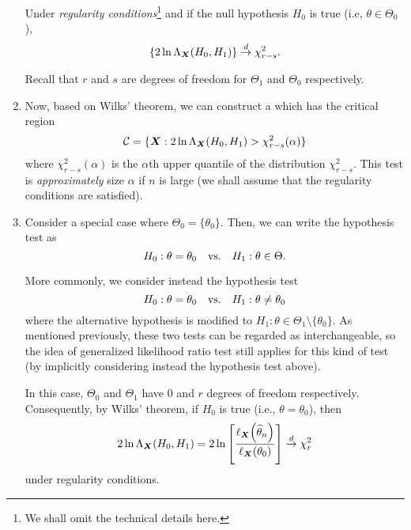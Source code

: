 \begin{enumerate}
\begin{theorem}
\label{thm:wilks}
Under \emph{regularity conditions}\footnote{We shall omit the technical details
here.} and if the null hypothesis \(H_0\) is true (i.e, \(\theta\in\Theta_0\)),
\[
\{2\ln\Lambda_{\vb*{X}}(H_0, H_1)\}\overset{d}{\to}\chi^2_{r-s}.
\]
\begin{note}
Recall that \(r\) and \(s\) are degrees of freedom for \(\Theta_1\) and
\(\Theta_0\) respectively.
\end{note}
\end{theorem}

\item Now, based on Wilks' theorem, we can construct a  which has the critical region
\[
\mathcal{C}=\{\vb*{X}:2\ln\Lambda_{\vb*{X}}(H_0, H_1)>\chi^2_{r-s}(\alpha)\}
\]
where \(\chi^2_{r-s}(\alpha)\) is the \(\alpha\)th upper quantile of the
distribution \(\chi^2_{r-s}\). This test is \emph{approximately} size
\(\alpha\) if \(n\) is large (we shall assume that the regularity conditions are
satisfied).


\item Consider a special case where \(\Theta_0=\{\theta_0\}\). Then, we can
write the hypothesis test as
\[
H_0:\theta=\theta_0\qqtext{vs.}H_1:\theta\in\Theta.
\]
\begin{note}
More commonly, we consider instead the hypothesis test
\[
H_0:\theta=\theta_0\qqtext{vs.}H_1:\theta\ne\theta_0
\]
where the alternative hypothesis is modified to \(H_1:
\theta\in\Theta_1\setminus\{\theta_0\}\). As mentioned previously, these two
tests can be regarded as interchangeable, so the idea of generalized likelihood
ratio test still applies for this kind of test (by implicitly considering
instead the hypothesis test above).
\end{note}

In this case, \(\Theta_0\) and \(\Theta_1\) have 0 and \(r\) degrees of freedom
respectively. Consequently, by Wilks' theorem, if \(H_0\) is true (i.e.,
\(\theta=\theta_0\)), then
\[
2\ln\Lambda_{\vb*{X}}(H_0,H_1)=
2\ln\qty[\frac{\ell_{\vb*{X}}\qty(\widehat{\theta}_n)}{\ell_{\vb*{X}}\qty(\theta_0)}]
\overset{d}{\to}\chi^2_r
\]
under regularity conditions.
\end{enumerate}
